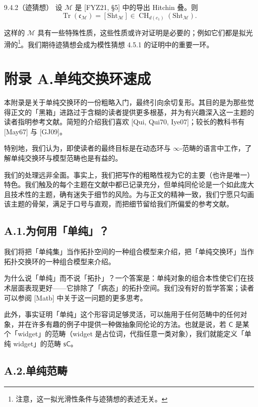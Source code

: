 \begin{conj}{9.4.2}（迹猜想）\label{thm:a6-06-11}
设 $\mathcal M$ 是 [FYZ21, §5] 中的导出 Hitchin 叠。则
\[
\operatorname{Tr}(\mathfrak c_{\mathcal M})=[\mathrm{Sht}_{\mathcal M}]\in\operatorname{CH}_{d(c_1)}(\mathrm{Sht}_{\mathcal M}).
\]
\end{conj}

这样的 $\mathcal M$ 具有一些特殊性质，这些性质或许对证明是必要的；例如它们都是拟光滑的\footnote{注意，这一拟光滑性条件与迹猜想的表述无关。}。我们期待迹猜想会成为模性猜想 4.5.1 的证明中的重要一环。

\section*{附录 A.\quad 单纯交换环速成}

本附录是关于单纯交换环的一份粗略入门，最终引向余切复形。其目的是为那些觉得正文的「黑箱」进路过于含糊的读者提供更多根基，并为有兴趣深入这一主题的读者指明参考文献。简短的介绍我们喜欢 [Qui, Qui70, Iye07]；较长的教科书有 [May67] 与 [GJ09]。

特别地，我们认为，即使读者的最终目标是在动态环与 $\infty$-范畴的语言中工作，了解单纯交换环与模型范畴也是有益的。

我们的处理远非全面。事实上，我们把写作的粗略性视为它的主要（也许是唯一）特色。我们触及的每个主题在文献中都已记录充分，但单纯同伦论是一个如此庞大且技术性的主题，确有迷失于细节的风险。为与正文的精神一致，我们宁愿只勾画该主题的骨架，满足于口号与直观，而把细节留给我们所偏爱的参考文献。

\subsection*{A.1.\quad 为何用「单纯」？}

我们将把「单纯集」当作拓扑空间的一种组合模型来介绍，把「单纯交换环」当作拓扑交换环的一种组合模型来介绍。

为什么说「单纯」而不说「拓扑」？一个答案是：单纯对象的组合本性使它们在技术层面表现更好——它排除了「病态」的拓扑空间。我们没有好的哲学答案；读者可以参阅 [Matb] 中关于这一问题的更多思考。

此外，事实证明「单纯」这个形容词足够灵活，可以施用于任何范畴中的任何对象，并在许多有趣的例子中提供一种做抽象同伦论的方法。也就是说，若 $\mathsf C$ 是某个「widget」的范畴（widget 是占位词，代指任意一类对象），我们就能定义「单纯 widget」的范畴 $\mathsf{sC}$。

\subsection*{A.2.\quad 单纯范畴}

